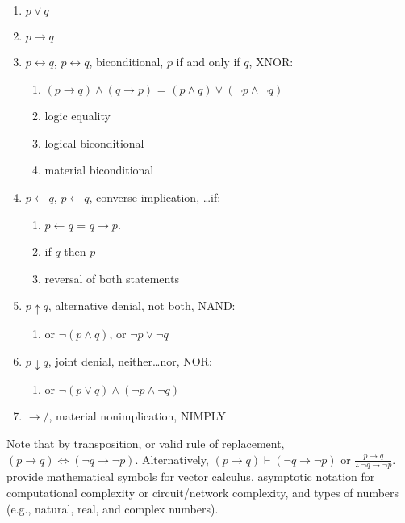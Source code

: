 \begin{enumerate}
\begin{enumerate}
\begin{enumerate}
		\item $p \lor q$
		\item $p \rightarrow q$
		\item $p \leftrightarrow q$, $p \longleftrightarrow q$, biconditional, $p$ if and only if $q$, XNOR: \vspace{-0.1cm}
			\begin{enumerate} \itemsep -1pt
			\item $(p \rightarrow q) \land (q \rightarrow p)$ = $(p \land q) \lor (\neg p \land \neg q)$
			\item logic equality
			\item logical biconditional
			\item material biconditional
			\end{enumerate}
		\item $p \leftarrow q$, $p \longleftarrow q$, converse implication, \dots if: \vspace{-0.1cm}
			\begin{enumerate} \itemsep -1pt
			\item $p \leftarrow q$ = $q \rightarrow p$.
			\item if $q$ then $p$
			\item reversal of both statements
			\end{enumerate}
		\item $p \uparrow q$, alternative denial, not both, NAND: \vspace{-0.1cm}
			\begin{enumerate} \itemsep -1pt
			\item or $\neg (p \land q)$, or $\neg p \lor \neg q$
			\end{enumerate}
		\item $p \downarrow q$, joint denial, neither\dots nor, NOR: \vspace{-0.1cm}
			\begin{enumerate} \itemsep -1pt
			\item or $\neg (p \lor q) \land (\neg p \land \neg q)$
			\end{enumerate}
		\item $\rightarrow/$, material nonimplication, NIMPLY
		\end{enumerate}
	\end{enumerate}
\end{enumerate}

Note that by transposition, or valid rule of replacement, $(p \rightarrow q) \Longleftrightarrow (\neg q \rightarrow \neg p)$. Alternatively, $(p \rightarrow q) \vdash (\neg q \rightarrow \neg p)$ or $\frac{p \rightarrow q}{\therefore\ \neg q \rightarrow \neg p}$. \\


\cite[Tables 185--187, pp. 100, in \S3]{Pakin2021} provide mathematical symbols for vector calculus, asymptotic notation for computational complexity or circuit/network complexity, and types of numbers (e.g., natural, real, and complex numbers).





